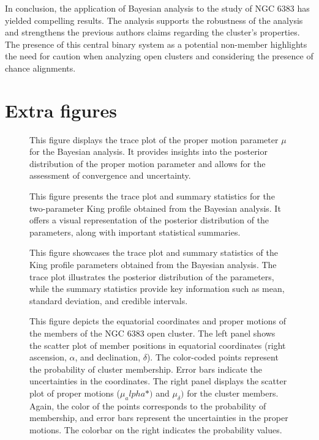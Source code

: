 \documentclass[fleqn,usenatbib,usedcolumn,useAMS]{mnras}
\begin{document}
In conclusion, the application of Bayesian analysis to the study of NGC 6383 has yielded compelling results. The analysis supports the robustness of the analysis and strengthens the previous authors claims regarding the cluster’s properties. The presence of this central binary system as a potential non-member highlights the need for caution when analyzing open clusters and considering the presence of chance alignments.



\appendix

\section{Extra figures}

\begin{figure}
	\centering
    \caption{This figure displays the trace plot of the proper motion parameter $\mu$ for the Bayesian analysis. It provides insights into the posterior distribution of the proper motion parameter and allows for the assessment of convergence and uncertainty.}
\end{figure}
\begin{figure}
	\centering
    \caption{This figure presents the trace plot and summary statistics for the two-parameter King profile obtained from the Bayesian analysis. It offers a visual representation of the posterior distribution of the parameters, along with important statistical summaries.}
\end{figure}
\begin{figure}
	\centering
    \caption{This figure showcases the trace plot and summary statistics of the King profile parameters obtained from the Bayesian analysis. The trace plot illustrates the posterior distribution of the parameters, while the summary statistics provide key information such as mean, standard deviation, and credible intervals.}
\end{figure}
\begin{figure}
	\centering
    \caption{This figure depicts the equatorial coordinates and proper motions of the members of the NGC 6383 open cluster. The left panel shows the scatter plot of member positions in equatorial coordinates (right ascension, $\alpha$, and declination, $\delta$). The color-coded points represent the probability of cluster membership. Error bars indicate the uncertainties in the coordinates. The right panel displays the scatter plot of proper motions ($\mu_alpha*)$ and $\mu_\delta)$ for the cluster members. Again, the color of the points corresponds to the probability of membership, and error bars represent the uncertainties in the proper motions. The colorbar on the right indicates the probability values.}
\end{figure}
\end{document}
